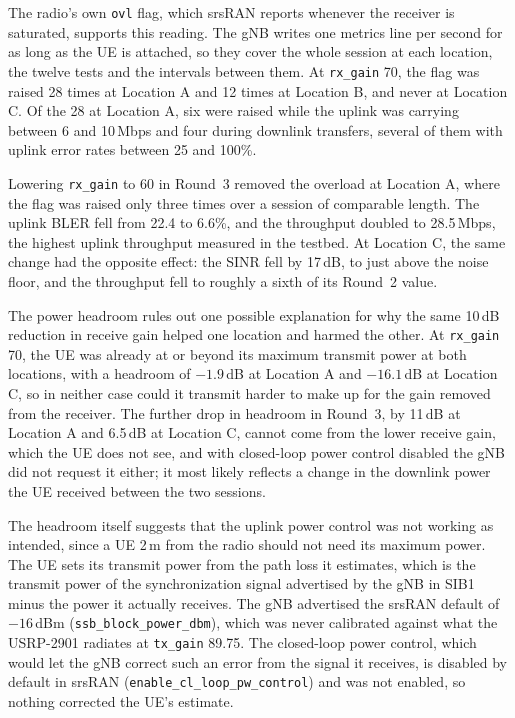 The radio's own \texttt{ovl} flag, which srsRAN reports whenever the receiver is saturated, supports this reading. The \gls{gNB} writes one metrics line per second for as long as the \gls{UE} is attached, so they cover the whole session at each location, the twelve tests and the intervals between them. At \texttt{rx\_gain} 70, the flag was raised 28 times at Location A and 12 times at Location B, and never at Location C. Of the 28 at Location A, six were raised while the uplink was carrying between 6 and 10\,Mbps and four during downlink transfers, several of them with uplink error rates between 25 and 100\%.

Lowering \texttt{rx\_gain} to 60 in Round~3 removed the overload at Location A, where the flag was raised only three times over a session of comparable length. The uplink \gls{BLER} fell from 22.4 to 6.6\%, and the throughput doubled to 28.5\,Mbps, the highest uplink throughput measured in the testbed. At Location C, the same change had the opposite effect: the \gls{SINR} fell by 17\,dB, to just above the noise floor, and the throughput fell to roughly a sixth of its Round~2 value.

The power headroom rules out one possible explanation for why the same 10\,dB reduction in receive gain helped one location and harmed the other. At \texttt{rx\_gain} 70, the \gls{UE} was already at or beyond its maximum transmit power at both locations, with a headroom of $-1.9$\,dB at Location A and $-16.1$\,dB at Location C, so in neither case could it transmit harder to make up for the gain removed from the receiver. The further drop in headroom in Round~3, by 11\,dB at Location A and 6.5\,dB at Location C, cannot come from the lower receive gain, which the \gls{UE} does not see, and with closed-loop power control disabled the \gls{gNB} did not request it either; it most likely reflects a change in the downlink power the \gls{UE} received between the two sessions.

The headroom itself suggests that the uplink power control was not working as intended, since a \gls{UE} 2\,m from the radio should not need its maximum power. The \gls{UE} sets its transmit power from the path loss it estimates, which is the transmit power of the synchronization signal advertised by the \gls{gNB} in \gls{SIB1} minus the power it actually receives. The \gls{gNB} advertised the srsRAN default of $-16$\,dBm (\texttt{ssb\_block\_power\_dbm}), which was never calibrated against what the USRP-2901 radiates at \texttt{tx\_gain} 89.75. The closed-loop power control, which would let the \gls{gNB} correct such an error from the signal it receives, is disabled by default in srsRAN (\texttt{enable\_cl\_loop\_pw\_control}) and was not enabled, so nothing corrected the \gls{UE}'s estimate.

